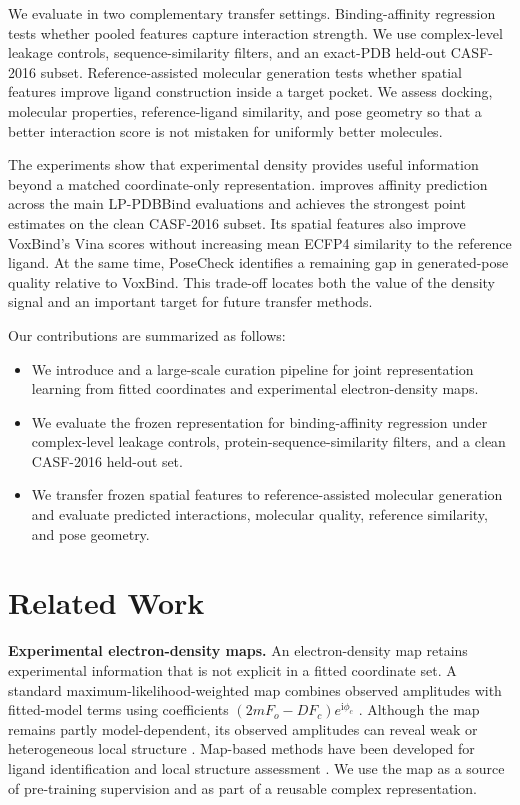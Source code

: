 We evaluate \ours{} in two complementary transfer settings. Binding-affinity
regression tests whether pooled features capture interaction strength. We use
complex-level leakage controls, sequence-similarity filters, and an exact-PDB
held-out CASF-2016 subset. Reference-assisted molecular generation tests whether
spatial features improve ligand construction inside a target pocket. We assess
docking, molecular properties, reference-ligand similarity, and pose geometry
so that a better interaction score is not mistaken for uniformly better
molecules.

The experiments show that experimental density provides useful information
beyond a matched coordinate-only representation. \ours{} improves affinity
prediction across the main LP-PDBBind evaluations and achieves the strongest
point estimates on the clean CASF-2016 subset. Its spatial features also improve
VoxBind's Vina scores without increasing mean ECFP4 similarity to the reference
ligand. At the same time, PoseCheck identifies a remaining gap in generated-pose
quality relative to VoxBind. This trade-off locates both the value of the density
signal and an important target for future transfer methods.

Our contributions are summarized as follows:
\begin{itemize}
    \item We introduce \ours{} and a large-scale curation pipeline for joint
    representation learning from fitted coordinates and experimental
    electron-density maps.
    \item We evaluate the frozen representation for binding-affinity regression
    under complex-level leakage controls, protein-sequence-similarity filters,
    and a clean CASF-2016 held-out set.
    \item We transfer frozen spatial features to reference-assisted molecular
    generation and evaluate predicted interactions, molecular quality,
    reference similarity, and pose geometry.
\end{itemize}


\section{Related Work}
\label{sec:related_works}

\textbf{Experimental electron-density maps.}
An electron-density map retains experimental information that is not explicit
in a fitted coordinate set. A standard maximum-likelihood-weighted map combines
observed amplitudes with fitted-model terms using coefficients
$(2mF_o-DF_c)e^{\mathrm{i}\phi_c}$ \citep{read1986improved}. Although the map
remains partly model-dependent, its observed amplitudes can reveal weak or
heterogeneous local structure
\citep{lang2010automated,lang2014protein}. Map-based methods have been developed
for ligand identification and local structure assessment
\citep{kowiel2019automatic,miyaguchi2021machine}. We use the map as a source of
pre-training supervision and as part of a reusable complex representation.

